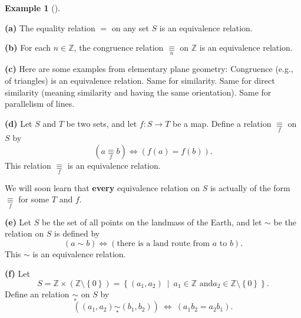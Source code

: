 \documentclass[numbers=enddot,12pt,final,onecolumn,notitlepage]{scrartcl}%
\numberwithin{exer}{subsection}
\theoremstyle{definition}
\newtheorem{exam}[theo]{Example}
\newenvironment{example}[1][]
{\begin{exam}[#1]\begin{leftbar}}
{\end{leftbar}\end{exam}}
\begin{document}
\begin{example}
\label{exa.equiv.eqrels1}\textbf{(a)} The equality relation $=$ on any set $S$
is an equivalence relation.

\textbf{(b)} For each $n\in\mathbb{Z}$, the congruence relation
$\underset{n}{\equiv}$ on $\mathbb{Z}$ is an equivalence relation.

\textbf{(c)} Here are some examples from elementary plane geometry: Congruence
(e.g., of triangles) is an equivalence relation. Same for similarity. Same for
direct similarity (meaning similarity and having the same orientation). Same
for parallelism of lines.

\textbf{(d)} Let $S$ and $T$ be two sets, and let $f:S\rightarrow T$ be a map.
Define a relation $\underset{f}{\equiv}$ on $S$ by%
\[
\left(  a\underset{f}{\equiv}b\right)  \Longleftrightarrow\left(  f\left(
a\right)  =f\left(  b\right)  \right)  .
\]
This relation $\underset{f}{\equiv}$ is an equivalence relation.

We will soon learn that \textbf{every} equivalence relation on $S$ is actually
of the form $\underset{f}{\equiv}$ for some $T$ and $f$.

\textbf{(e)} Let $S$ be the set of all points on the landmass of the Earth,
and let $\sim$ be the relation on $S$ is defined by%
\[
\left(  a\sim b\right)  \Longleftrightarrow\left(  \text{there is a land route
from }a\text{ to }b\right)  .
\]
This $\sim$ is an equivalence relation.

\textbf{(f)} Let
\[
S=\mathbb{Z}\times\left(  \mathbb{Z}\setminus\left\{  0\right\}  \right)
=\left\{  \left(  a_{1},a_{2}\right)  \ \mid\ a_{1}\in\mathbb{Z}\text{ and
}a_{2}\in\mathbb{Z}\setminus\left\{  0\right\}  \right\}  .
\]
Define an relation $\underset{\ast}{\sim}$ on $S$ by%
\[
\left(  \left(  a_{1},a_{2}\right)  \underset{\ast}{\sim}\left(  b_{1}%
,b_{2}\right)  \right)  \ \Longleftrightarrow\ \left(  a_{1}b_{2}=a_{2}%
b_{1}\right)  .
\]



\end{example}
\end{document}
